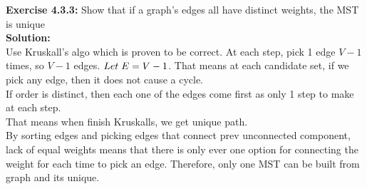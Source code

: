 \documentclass[11pt,fleqn]{article}
\begin{document}
\textbf{Exercise 4.3.3:} Show that if a graph’s edges all have distinct weights, the MST is unique\\

\textbf{Solution:}\\
Use Kruskall's algo which is proven to be correct. At each step, pick 1 edge $V-1$ times, so $V-1$ edges. $Let \thickspace E=V-1$. That means at each candidate set, if we pick any edge, then it does not cause a cycle.\\

If order is distinct, then each one of the edges come first as only 1 step to make at each step.\\

That means when finish Kruskalls, we get unique path.\\

By sorting edges and picking edges that connect prev unconnected component, lack of equal weights means that there is only ever one option for connecting the weight for each time to pick an edge. Therefore, only one MST can be built from graph and its unique.

	
\end{document}
